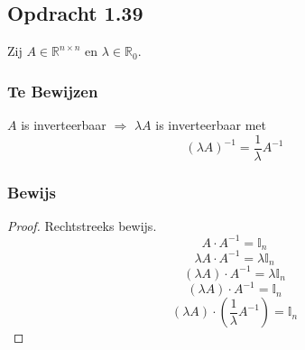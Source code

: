 \documentclass[lineaire_algebra_oplossingen.tex]{subfiles}
\begin{document}
\subsection{Opdracht 1.39}
\label{1.39}
Zij $A\in \mathbb{R}^{n\times n}$ en $\lambda \in \mathbb{R}_0$.
\subsubsection*{Te Bewijzen}
$A$ is inverteerbaar $\Rightarrow$ $\lambda A$ is inverteerbaar met 
\[
(\lambda A)^{-1} = \frac{1}{\lambda}A^{-1}
\]

\subsubsection*{Bewijs}
\begin{proof}
Rechtstreeks bewijs.\\
\[
A\cdot A^{-1} = \mathbb{I}_n
\]
\[
\lambda A\cdot A^{-1} = \lambda\mathbb{I}_n
\]
\[
(\lambda A)\cdot A^{-1} = \lambda\mathbb{I}_n
\]
\[
(\lambda A)\cdot A^{-1} = \mathbb{I}_n
\]
\[
(\lambda A)\cdot (\frac{1}{\lambda}A^{-1}) = \mathbb{I}_n
\]
\end{proof}
\end{document}
